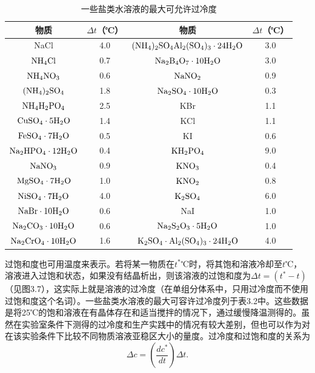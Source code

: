 \begin{table}[hpbt]
\centering
\caption{一些盐类水溶液的最大可允许过冷度}
\begin{tabular}{c|c||c|c}\toprule
物质 & $\Delta t$（℃） & 物质 & $\Delta t$（℃）\\\midrule
NaCl & 4.0 & $\rm (NH_4)_2SO_4Al_2(SO_4)_3\cdot 24H_2O$ & 3.0\\
$\rm NH_4Cl$ & 0.7 & $\rm Na_2B_4O_7\cdot 10H_2O$ & 3.0\\
$\rm NH_4NO_3$ & 0.6 & $\rm NaNO_2$ & 0.9\\
$\rm (NH_4)_2SO_4$ & 1.8 & $\rm Na_2SO_4\cdot 10H_2O$ & 0.3\\
$\rm NH_4H_2PO_4$ & 2.5 & KBr & 1.1\\
$\rm CuSO_4\cdot 5H_2O$ & 1.4 & KCl & 1.1\\
$\rm FeSO_4\cdot 7H_2O$ & 0.5 & KI & 0.6\\
$\rm Na_2HPO_4\cdot 12H_2O$ & 0.4 & $\rm KH_2PO_4$ & 9.0\\
$\rm NaNO_3$ & 0.9 & $\rm KNO_3$ & 0.4\\
$\rm MgSO_4\cdot 7H_2O$ & 1.0 & $\rm KNO_2$ & 0.8\\
$\rm NiSO_4\cdot 7H_2O$ & 4.0 & $\rm K_2SO_4$ & 6.0\\
$\rm NaBr\cdot 10H_2O$ & 0.6 & NaI & 1.0\\
$\rm Na_2CO_3\cdot 10H_2O$ & 0.6 & $\rm Na_2S_2O_3\cdot 5H_2O$ & 1.0\\
$\rm Na_2CrO_4\cdot 10H_2O$ & 1.6 & $\rm K_2SO_4\cdot Al_2(SO_4)_3\cdot 24H_2O$ & 4.0\\
\bottomrule
\end{tabular}
\end{table}
过饱和度也可用温度来表示。若将某一物质在$t^*$℃时，将其饱和溶液冷却至$t$℃，溶液进入过饱和状态，如果没有结晶析出，则该溶液的过饱和度为$\Delta t=(t^*-t)$（见图3.7），这实际上就是溶液的过冷度（在单组分体系中，只用过冷度而不使用过饱和度这个名词）。一些盐类水溶液的最大可容许过冷度列于表3.2中。这些数据是将25℃的饱和溶液在有晶体存在和适当搅拌的情况下，通过缓慢降温测得的。虽然在实验室条件下测得的过冷度和生产实践中的情况有较大差别，但也可以作为对在该实验条件下比较不同物质溶液亚稳区大小的量度。过冷度和过饱和度的关系为
\begin{equation}
\Delta c = \left(\frac{dc^*}{dt}\right)\Delta t.
\end{equation}
